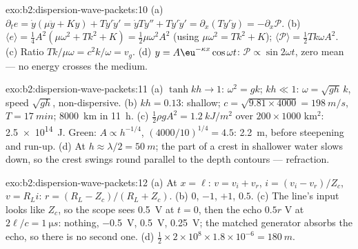 \begin{solution}{exo:b2:dispersion-wave-packets:10}
(a) $\partial_te = \dot y(\mu\ddot y + Ky) + Ty'\dot y' = \dot yTy'' + Ty'\dot y' = \partial_x
(Ty'\dot y) = -\partial_x\mathcal P$. (b) $\langle e\rangle = \tfrac14A^2(\mu\omega^2 + Tk^2 + K) =
\tfrac12\mu\omega^2A^2$ (using $\mu\omega^2 = Tk^2 + K$); $\langle\mathcal P\rangle = \tfrac12Tk\omega
A^2$. (c) Ratio $Tk/\mu\omega = c^2k/\omega = v_g$. (d) $y = A\eu^{-\kappa x}\cos\omega t$:
$\mathcal P \propto \sin2\omega t$, zero mean --- no energy crosses the medium.
\end{solution}

\begin{solution}{exo:b2:dispersion-wave-packets:11}
(a) $\tanh kh \to 1$: $\omega^2 = gk$; $kh \ll 1$: $\omega = \sqrt{gh}\,k$, speed $\sqrt{gh}$,
non-dispersive. (b) $kh = 0.13$: shallow; $c = \sqrt{9.81 \times 4000} = \qty{198}{m/s}$,
$T = \qty{17}{min}$; \qty{8000}{km} in \qty{11}{h}. (c) $\tfrac12\rho gA^2 = \qty{1.2}{kJ/m^2}$
over $200 \times 1000$ km$^2$: \qty{2.5e14}{J}. Green: $A \propto h^{-1/4}$, $(4000/10)^{1/4}
= 4.5$: \qty{2.2}{m}, before steepening and run-up. (d) At $h \approx \lambda/2 =
\qty{50}{m}$; the part of a crest in shallower water slows down, so the
crest swings round parallel to the depth contours --- refraction.
\end{solution}

\begin{solution}{exo:b2:dispersion-wave-packets:12}
(a) At $x = \ell$: $v = v_i + v_r$, $i = (v_i - v_r)/Z_c$, $v = R_Li$: $r = (R_L -
Z_c)/(R_L + Z_c)$. (b) $0$, $-1$, $+1$, $0.5$. (c) The line's input looks like
$Z_c$, so the scope sees \qty{0.5}{V} at $t = 0$, then the echo $0.5r$ V at
$2\ell/c = \qty{1}{\micro s}$: nothing, \qty{-0.5}{V}, \qty{+0.5}{V}, \qty{+0.25}{V}; the
matched generator absorbs the echo, so there is no second one. (d)
$\tfrac12 \times 2 \times 10^8 \times 1.8 \times 10^{-6} = \qty{180}{m}$.
\end{solution}


